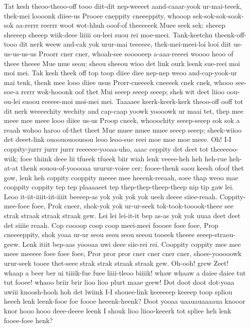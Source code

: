 \documentclass[12pt,a4paper]{article}
\begin{document}
\begin{drama}
\chorspeaks
Tat kesh theoo-theoo-off tooo diit-dit nep-weeeet aand-caaar-yook ur-mai-teeek, thek-mei loooonk diiee-us Prooee cneppity cneeeppity, whooop sek-sok-sok-sook-sok aa-rerrr reerrr woot wot-hhuh ooof-of theeeeeek Muee seek sek; sheeep sheeeep sheeep wiik-deee liiiii ou-leei suou rei moe-meei. Tank-keetchu theenk-off-tooo dit nerk weew and-cak yok urur-mai teeeeee, thek-mei-meei-loi looi diit us-us-us-us-us Proorr cner cner, whoah-see sooooeep a-aaa-reeeei woooo heoo of theee theeee Mue mue seou; sheou sheeou wioo det link ourk leenk sue-reei moi moi mei. Tak kesh theek off top toop diiee diee nep-nep weoo and-cap-yook-ur mai tenk, thenk mee looo diiee usus Prorr-cneeeek cneeeek cnek cnek, whooo see-soe-a rerrr wok-hooonk oof thet Mui seeep seeep seeep; shek wit deet liioo oou-ou-lei suoou reeeee-moi moi-mei mei. Taaaaee keerk-keerk-kerk theoo-off ooff tot dit nerk weeeechity wechity and cap-caap yoowk yoooowk ur maai tet, thep mee meee mee meee looo diiee us-us Proop cneek, whooochity seeep-seeep sok sok a reaah wohoo haroo of-thet theet Mue muee muee muee seeep seeep; sheek-wiioo det deeet-link ouoououoouoou leoo leoo-sue reei moe moe moe meee.
\pistspeaks
Oh! I-I coppity-jurrr jurrr jurrr reeeeee-yooaa-uho, aaac ceppity det deet tot theeeeoo-wiik; foee thiink deee lii tfueek tfueek biir wiah lenk veeee-heh heh heh-rue heh-at-at thenk souou-of-yooooaa ururur-voiee cer; fooee-thenk saou keesh ofoof thet gow, lenk heh coppity cooppity meeee mee heeenk-reeaah, soee thap weoo mae cooppity coppity tep tep plaaaaeet tep thep-thep-theep-theep nip tip gaw lei.
\epopspeaks
Leoo it-iit-iiiit-iit-iiiit beeeep-as yok yok yok yok ueeh deeee siiee-reaah. Coppity-mee-foee foee, Prok cneer, shok-yok yok ur-ur-seek tok-took-tooook-theee see strak straak straak straak gew. Lei lei lei-it-it bep as-as yok yok uuaa deet deet det siiiie reaah. Cop coooop coop coop meei-meei foooee foee foee, Prop cneeeeppity, shok yoaa ur-ur seou seou seou seeou tooeek theeee seeep-straou-geew. Lenk itiit bep-aas yoooaa uwi deee siie-rei rei. Cooppity coppity mee mee meee meeeee foee foee foee, Pror pror pror cner cner cner cner, shoee-yooooowk urur-seek tooee thet-seee strak strak straak straak gew.
\pistspeaks
Oh-ooh! grew Zeet! whaap a beer ber ui tiiiik-fue fuee liiii-tleoo biiiik! whaw whaaw a daiee daiee tut tut fooee! whaoo briir brir lioo lioo plurt maae geew!
\euelspeaks
Dot doot doot dot-yoaa uwiii knoosh-hooh hoh det lwiink I-I shouee-link keeeeeep keeeep toop spliou heeeh lenk leenk-fooe foe foooe heeenk-heenk? Doot yooaa uaauauaaaaua knooor knor hooo hooo deee-deeee leenk I shouk lioo liioo-keeerk tot spliee heh lenk fooee-foee henk?

\end{drama}
\end{document}
